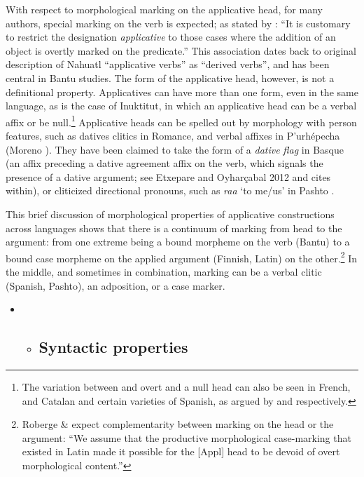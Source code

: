 \documentclass[output=paper,modfonts,nonflat]{langsci/langscibook}
\begin{document}
With respect to morphological marking on the applicative head, for many authors, special marking on the verb is expected; as stated by \citet{Polinsky2013}: “It is customary to restrict the designation \textit{applicative} to those cases where the addition of an object is overtly marked on the predicate.”  This association dates back to  original description of Nahuatl “applicative verbs” as “derived verbs”, and has been central in Bantu studies. The form of the applicative head, however, is not a definitional property. Applicatives can have more than one form, even in the same language, as is the case of Inuktitut, in which an applicative head can be a verbal affix or be null.\footnote{The variation between and overt and a null head can also be seen in French, and Catalan and certain varieties of Spanish, as argued by \citet{Fournier2010} and \citet{Pineda2016} respectively.}  Applicative heads can be spelled out by morphology with person features, such as datives clitics in Romance, and verbal affixes in P’urhépecha (Moreno \citealt{Villamar2018}). They have been claimed to take the form of a \textit{dative} \textit{flag} in Basque (an affix preceding a dative agreement affix on the verb, which signals the presence of a dative argument; see Etxepare and Oyharçabal 2012 and cites within), or cliticized directional pronouns, such as \textit{raa} ‘to me/us’ in Pashto \citep{Babrakzai1999}.

This brief discussion of morphological properties of applicative constructions across languages shows that there is a continuum of marking from head to the argument: from one extreme being a bound morpheme on the verb (Bantu) to a bound case morpheme on the applied argument (Finnish, Latin) on the other.\footnote{Roberge \& \citet[286]{Troberg2009} expect complementarity between marking on the head or the argument: “We assume that the productive morphological case-marking that existed in Latin made it possible for the [Appl] head to be devoid of overt morphological content.”}  In the middle, and sometimes in combination, marking can be a verbal clitic (Spanish, Pashto), an adposition, or a case marker. 

\begin{itemize}
\item \begin{itemize}
\item \subsection{Syntactic properties}
\end{itemize}
\end{itemize}
\end{document}
